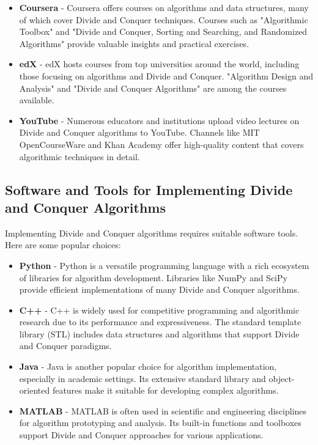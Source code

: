 \documentclass[12pt]{book} %
\begin{document}
\begin{itemize}
    \item \textbf{Coursera} - Coursera offers courses on algorithms and data structures, many of which cover Divide and Conquer techniques. Courses such as "Algorithmic Toolbox" and "Divide and Conquer, Sorting and Searching, and Randomized Algorithms" provide valuable insights and practical exercises.
    
    \item \textbf{edX} - edX hosts courses from top universities around the world, including those focusing on algorithms and Divide and Conquer. "Algorithm Design and Analysis" and "Divide and Conquer Algorithms" are among the courses available.
    
    \item \textbf{YouTube} - Numerous educators and institutions upload video lectures on Divide and Conquer algorithms to YouTube. Channels like MIT OpenCourseWare and Khan Academy offer high-quality content that covers algorithmic techniques in detail.
\end{itemize}

\subsection{Software and Tools for Implementing Divide and Conquer Algorithms}
Implementing Divide and Conquer algorithms requires suitable software tools. Here are some popular choices:

\begin{itemize}
    \item \textbf{Python} - Python is a versatile programming language with a rich ecosystem of libraries for algorithm development. Libraries like NumPy and SciPy provide efficient implementations of many Divide and Conquer algorithms.
    
    \item \textbf{C++} - C++ is widely used for competitive programming and algorithmic research due to its performance and expressiveness. The standard template library (STL) includes data structures and algorithms that support Divide and Conquer paradigms.
    
    \item \textbf{Java} - Java is another popular choice for algorithm implementation, especially in academic settings. Its extensive standard library and object-oriented features make it suitable for developing complex algorithms.
    
    \item \textbf{MATLAB} - MATLAB is often used in scientific and engineering disciplines for algorithm prototyping and analysis. Its built-in functions and toolboxes support Divide and Conquer approaches for various applications.
\end{itemize}
\end{document}
